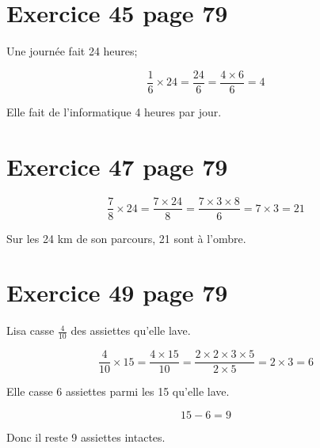 \documentclass[12pt,a4paper]{article}
\begin{document}
\section*{Exercice 45 page 79}

Une journée fait 24 heures;

\begin{equation*}
	\dfrac{1}{6} \times 24 = \dfrac{24}{6} = \dfrac{4 \times 6}{6}= 4
\end{equation*}

Elle fait de l'informatique 4 heures par jour.

\newpage

\section*{Exercice 47 page 79}

\begin{equation*}
\dfrac{7}{8} \times 24 = \dfrac{7 \times 24}{8} = \dfrac{7 \times 3 \times 8}{6}= 7 \times 3 = 21
\end{equation*}

Sur les 24 km de son parcours, 21 sont à l'ombre.


\section*{Exercice 49 page 79}

Lisa casse $\frac{4}{10}$ des assiettes qu'elle lave.

\begin{equation*}
\dfrac{4}{10} \times 15 = \dfrac{4 \times 15}{10} = \dfrac{2 \times 2 \times 3 \times 5}{2 \times 5}= 2 \times 3 = 6
\end{equation*}

Elle casse 6 assiettes parmi les 15 qu'elle lave.

\begin{equation*}
	15 - 6 = 9
\end{equation*}

Donc il reste 9 assiettes intactes.
\end{document}
